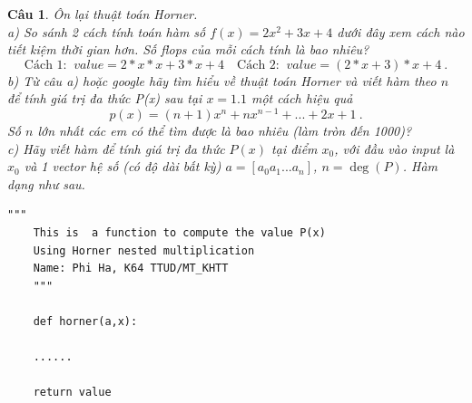 \documentclass[answers]{exam}
\newtheorem{bt}{Câu}
\begin{document}
\begin{bt} Ôn lại thuật toán Horner. \\
a) So sánh 2 cách tính toán hàm số $f(x) = 2x^2 + 3 x + 4$ dưới đây xem cách nào tiết kiệm thời gian hơn. Số flops của mỗi cách tính là bao nhiêu?
%
\begin{equation}
 \mbox{Cách 1: } \	value = 2 * x * x + 3 * x + 4 \quad  \mbox{Cách 2: } \	value = (2 * x + 3) * x + 4 \ .
\end{equation}
%
b) Từ câu a) hoặc google hãy tìm hiểu về thuật toán Horner và viết hàm theo $n$ để tính giá trị đa thức P(x) sau tại $x = 1.1$ một cách hiệu quả
%
\[
p(x) = (n+1) x^n + n x^{n-1} + ... + 2x + 1 \ .
\]
%
Số $n$ lớn nhất các em có thể tìm được là bao nhiêu (làm tròn đến 1000)? \\
c) Hãy viết hàm để tính giá trị đa thức $P(x)$ tại điểm $x_0$, với đầu vào input là $x_0$ và 1 vector hệ số (có độ dài bất kỳ) $a = [a_0 a_{1} ... a_{n}]$, $n = \deg(P)$. Hàm dạng như sau.

%
\begin{lstlisting}[frame=single] 
	"""
	This is  a function to compute the value P(x)
	Using Horner nested multiplication
	Name: Phi Ha, K64 TTUD/MT_KHTT
	"""
	
	def horner(a,x):
	
	......
	
	return value
\end{lstlisting}
%
\end{bt}
\end{document}
